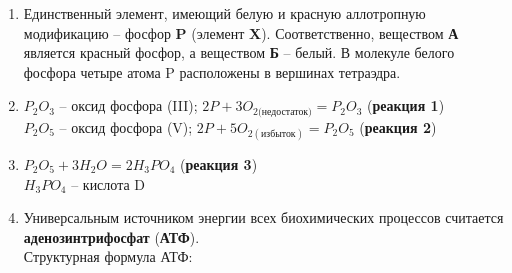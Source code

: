 \solutionSection

\begin{enumerate}
    \item Единственный элемент, имеющий белую и красную аллотропную модификацию – фосфор \textbf{P} (элемент \textbf{X}).
    Соответственно, веществом \textbf{А} является красный фосфор, а веществом \textbf{Б} – белый.
    В молекуле белого фосфора четыре атома P расположены в вершинах тетраэдра.
    \item $P_2O_3$ – оксид фосфора (III); $2P + 3O_{2\text{(недостаток)}} = P_2O_3$ (\textbf{реакция 1})\\
    $P_2O_5$ – оксид фосфора (V); $2P + 5O_{2(\text{избыток})} = P_2O_5$ (\textbf{реакция 2})
    \item $P_2O_5 + 3H_2O = 2H_3PO_4$ (\textbf{реакция 3})\\
    $H_3PO_4$ – кислота D
    \item Универсальным источником энергии всех биохимических процессов считается \textbf{аденозинтрифосфат} (\textbf{АТФ}).\\
    Структурная формула АТФ:\\
    
\end{enumerate}